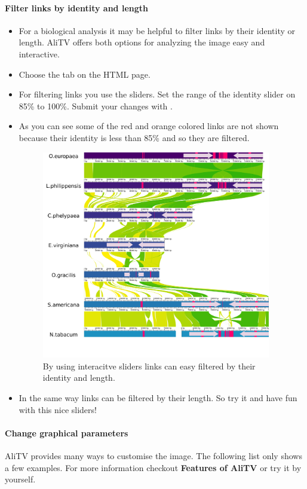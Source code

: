\documentclass[a4paper]{scrartcl}
\begin{document}
\paragraph*{Filter links by identity and length}
\begin{itemize}
	\item For a biological analysis it may be helpful to filter links by their identity or length. AliTV offers both options for analyzing the image easy and interactive.
	\item Choose the tab  on the HTML page.
	\item For filtering links you use the sliders. Set the range of the identity slider on 85\% to 100\%. Submit your changes with .
	\item As you can see some of the red and orange colored links are not shown because their identity is less than 85\% and so they are filtered.
	\begin{figure}[H]
		\centering
		\includegraphics[width=10cm]{filterLinks.png}
		\caption{By using interacitve sliders links can easy filtered by their identity and length.}
	\end{figure}
	\item In the same way links can be filtered by their length. So try it and have fun with this nice sliders!
\end{itemize}

\paragraph*{Change graphical parameters}
AliTV provides many ways to customise the image. The following list only shows a few examples. For more information checkout \textbf{Features of AliTV} or try it by yourself.
\end{document}
